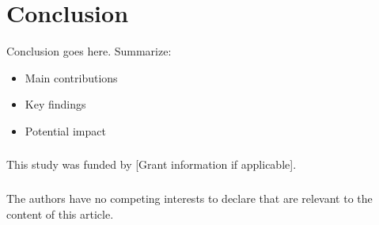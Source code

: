 \documentclass[runningheads]{llncs}
\begin{document}
%
\section{Conclusion}
\label{sec:conclusion}

Conclusion goes here. Summarize:
\begin{itemize}
\item Main contributions
\item Key findings
\item Potential impact
\end{itemize}

%
\begin{credits}
\subsubsection{\ackname} 
This study was funded by [Grant information if applicable].

\subsubsection{\discintname}
The authors have no competing interests to declare that are relevant to the 
content of this article.
\end{credits}
\end{document}
